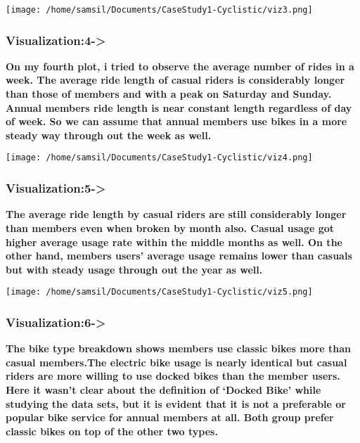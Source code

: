 \documentclass[
]{article}
\begin{document}
\texttt{[image: /home/samsil/Documents/CaseStudy1-Cyclistic/viz3.png]}

\hypertarget{visualization4-}{%
\subsubsection{\texorpdfstring{\textbf{Visualization:4-\textgreater{}}}{Visualization:4-\textgreater{}}}\label{visualization4-}}

\textbf{On my fourth plot, i tried to observe the average number of
rides in a week. The average ride length of casual riders is
considerably longer than those of members and with a peak on Saturday
and Sunday. Annual members ride length is near constant length
regardless of day of week. So we can assume that annual members use
bikes in a more steady way through out the week as well.}

\texttt{[image: /home/samsil/Documents/CaseStudy1-Cyclistic/viz4.png]}

\hypertarget{visualization5-}{%
\subsubsection{\texorpdfstring{\textbf{Visualization:5-\textgreater{}}}{Visualization:5-\textgreater{}}}\label{visualization5-}}

\textbf{The average ride length by casual riders are still considerably
longer than members even when broken by month also. Casual usage got
higher average usage rate within the middle months as well. On the other
hand, members users' average usage remains lower than casuals but with
steady usage through out the year as well.}

\texttt{[image: /home/samsil/Documents/CaseStudy1-Cyclistic/viz5.png]}

\hypertarget{visualization6-}{%
\subsubsection{\texorpdfstring{\textbf{Visualization:6-\textgreater{}}}{Visualization:6-\textgreater{}}}\label{visualization6-}}

\textbf{The bike type breakdown shows members use classic bikes more
than casual members.The electric bike usage is nearly identical but
casual riders are more willing to use docked bikes than the member
users. Here it wasn't clear about the definition of `Docked Bike' while
studying the data sets, but it is evident that it is not a preferable or
popular bike service for annual members at all. Both group prefer
classic bikes on top of the other two types.}
\end{document}
